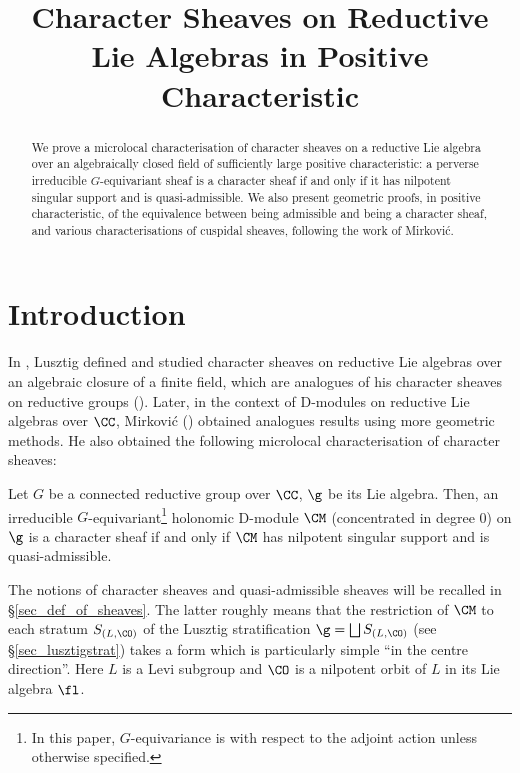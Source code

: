
\title{Character Sheaves on Reductive Lie Algebras in Positive Characteristic}
\maketitle
\begin{abstract}
We prove a microlocal characterisation of character sheaves on a reductive Lie algebra over an algebraically closed field of sufficiently large positive characteristic: a perverse irreducible $G$-equivariant sheaf is a character sheaf if and only if it has nilpotent singular support and is quasi-admissible. We also present geometric proofs, in positive characteristic, of the equivalence between being admissible and being a character sheaf, and various characterisations of cuspidal sheaves, following the work of Mirković.
\end{abstract}


\section{Introduction}
In \cite{lusztig_fourier_1987}, Lusztig defined and studied character sheaves on reductive Lie algebras over an algebraic closure of a finite field, which are analogues of his character sheaves on reductive groups (\cites{lusztig_intersection_1984, lusztig_character_1985}). Later, in the context of D-modules on reductive Lie algebras over $\CC$, Mirković (\cite{mirkovic_character_2004}) obtained analogues results using more geometric methods. He also obtained the following microlocal characterisation of character sheaves: 

\begin{theorem}\label{thm_mirk_intro}
    Let $G$ be a connected reductive group over $\CC$, $\g$ be its Lie algebra. Then, an irreducible $G$-equivariant\footnote{In this paper, $G$-equivariance is with respect to the adjoint action unless otherwise specified.} holonomic D-module $\CM$ (concentrated in degree 0) on $\g$ is a character sheaf if and only if $\CM$ has nilpotent singular support and is quasi-admissible. 
\end{theorem}

The notions of character sheaves and quasi-admissible sheaves will be recalled in §\ref{sec_def_of_sheaves}. The latter roughly means that the restriction of $\CM$ to each stratum $S_{(L,\CO)}$ of the Lusztig stratification $\g=\bigsqcup S_{(L,\CO)}$ (see §\ref{sec_lusztigstrat}) takes a form which is particularly simple “in the centre direction”. Here $L$ is a Levi subgroup and $\CO$ is a nilpotent orbit of $L$ in its Lie algebra $\fl$.\\


